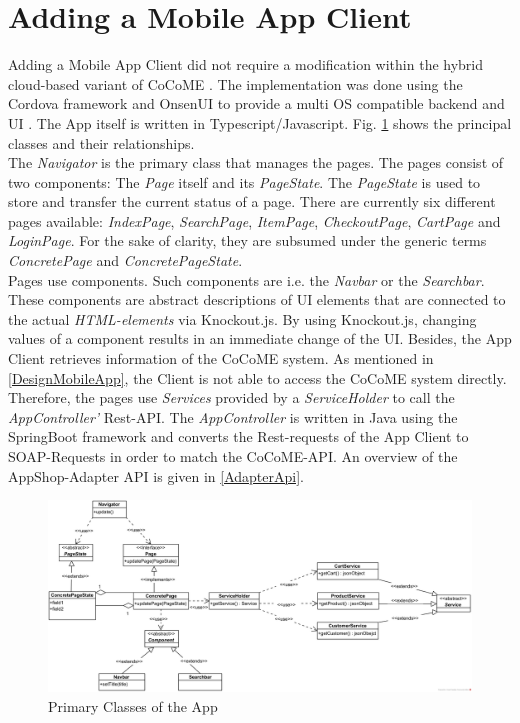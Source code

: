  \section{Adding a Mobile App Client}\label{AppImplementation}
 Adding a Mobile App Client did not require a modification within the hybrid cloud-based variant of CoCoME \cite{HeinrichRostamiReussner2016_1000052688}. The implementation was done using the Cordova framework and OnsenUI to provide a multi OS compatible backend and UI \cite{schnabel}. The App itself is written in Typescript/Javascript. Fig. \ref{App_ClassDiagram} shows the principal classes and their relationships.
 \\
  The \textit{Navigator} is the primary class that manages the pages. The pages consist of two components: The \textit{Page} itself and its \textit{PageState}. The \textit{PageState} is used to store and transfer the current status of a page. There are currently six different pages available: \textit{IndexPage}, \textit{SearchPage}, \textit{ItemPage}, \textit{CheckoutPage}, \textit{CartPage} and \textit{LoginPage}. For the sake of clarity, they are subsumed under the generic terms \textit{ConcretePage} and \textit{ConcretePageState}. 
  \\
  Pages use components. Such components are i.e. the \textit{Navbar} or the \textit{Searchbar}. These components are abstract descriptions of UI elements that are connected to the actual \textit{HTML-elements} via Knockout.js. By using Knockout.js, changing values of a component results in an immediate change of the UI. 
  Besides, the App Client retrieves information of the CoCoME system.  As mentioned in \ref{DesignMobileApp}, the Client is not able to access the CoCoME system directly. Therefore, the pages use \textit{Services} provided by a \textit{ServiceHolder} to call the \textit{AppController'} Rest-API. The \textit{AppController} is written in Java using the SpringBoot framework and converts the Rest-requests of the App Client to SOAP-Requests in order to match the CoCoME-API. An overview of the AppShop-Adapter API is given in \ref{AdapterApi}.
  
  
  
   \begin{figure}[!h]
  	\includegraphics[width=\textwidth]{img/appBasicClass.png}
  	\caption{Primary Classes of the App}
  	\label{App_ClassDiagram}
  \end{figure}

